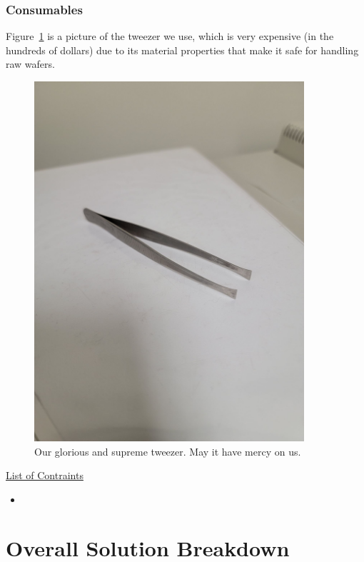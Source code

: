 \documentclass{article}
\begin{document}
        \newpage
        \subsubsection{Consumables} \label{consumables} 
        
          Figure~\ref{tweezer} is a picture of the tweezer we use, which is very expensive (in the hundreds of dollars)
          due to its material properties that make it safe for handling raw wafers.

          \begin{figure}[H]
            \centering
            \includegraphics[width=10cm]{figures/tweezers.jpg}
            \caption{Our glorious and supreme tweezer. May it have mercy on us.}
            \label{tweezer}
          \end{figure}

          \underline{List of Contraints}
          \begin{itemize}
            \item 
          \end{itemize}  

    \section{Overall Solution Breakdown} \label{solution}
    
\end{document}
